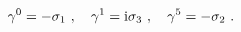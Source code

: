 \begin{equation}
\gamma^0 =-\sigma_1\ , \quad \gamma^1= {\rm i} \sigma_3 \ , \quad  \gamma^5 = - \sigma_2 \ .
\label{d1f}
\end{equation}

